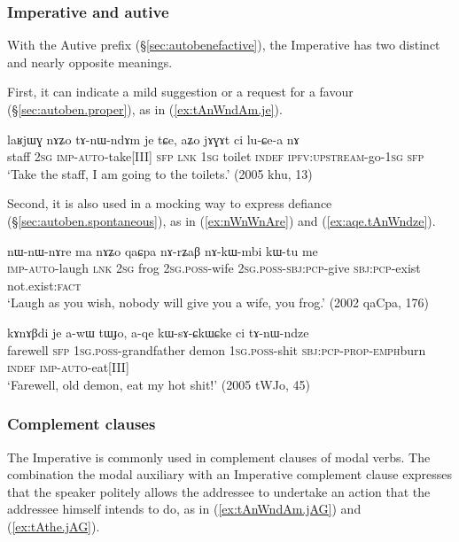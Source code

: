 \subsubsection{Imperative and autive} \label{sec:imp.autive}
With the Autive prefix (§\ref{sec:autobenefactive}), the Imperative has two distinct and nearly opposite meanings. 

First, it can indicate a mild suggestion or a request for a favour (§\ref{sec:autoben.proper}), as in (\ref{ex:tAnWndAm.je}).

\begin{exe}
\ex \label{ex:tAnWndAm.je}
\gll laʁjɯɣ nɤʑo tɤ-nɯ-ndɤm je tɕe, aʑo jɤɣɤt ci lu-ɕe-a nɤ \\
staff \textsc{2sg} \textsc{imp}-\textsc{auto}-take[III] \textsc{sfp} \textsc{lnk} \textsc{1sg} toilet \textsc{indef} \textsc{ipfv}:\textsc{upstream}-go-\textsc{1sg} \textsc{sfp} \\
\glt `Take the staff, I am going to the toilets.' (2005 khu, 13)
\end{exe}

Second, it is also used in a mocking way to express defiance (§\ref{sec:autoben.spontaneous}), as in (\ref{ex:nWnWnAre}) and (\ref{ex:aqe.tAnWndze}).

\begin{exe}
\ex  \label{ex:nWnWnAre}
\gll  nɯ-nɯ-nɤre ma nɤʑo qaɕpa nɤ-rʑaβ nɤ-kɯ-mbi kɯ-tu me   \\
\textsc{imp}-\textsc{auto}-laugh \textsc{lnk} \textsc{2sg} frog \textsc{2sg}.\textsc{poss}-wife \textsc{2sg}.\textsc{poss}-\textsc{sbj}:\textsc{pcp}-give \textsc{sbj}:\textsc{pcp}-exist not.exist:\textsc{fact} \\
\glt `Laugh as you wish, nobody will give you a wife, you frog.'   (2002 qaCpa, 176)
\end{exe} 

\begin{exe}
\ex  \label{ex:aqe.tAnWndze}
\gll kɤnɤβdi je a-wɯ tɯɟo, a-qe kɯ-sɤ-ɕkɯ\redp{}ɕke ci tɤ-nɯ-ndze \\
farewell \textsc{sfp} \textsc{1sg}.\textsc{poss}-grandfather demon \textsc{1sg}.\textsc{poss}-shit \textsc{sbj}:\textsc{pcp}-\textsc{prop}-\textsc{emph}\redp{}burn \textsc{indef} \textsc{imp}-\textsc{auto}-eat[III] \\
\glt `Farewell, old demon, eat my hot shit!' (2005 tWJo, 45)
\end{exe}

\subsubsection{Complement clauses} \label{sec:imp.compl}
The Imperative is commonly used in complement clauses of modal verbs. The combination the modal auxiliary  with an Imperative complement clause expresses that the speaker politely allows the addressee to undertake an action that the addressee himself intends to do, as in (\ref{ex:tAnWndAm.jAG}) and (\ref{ex:tAthe.jAG}).

